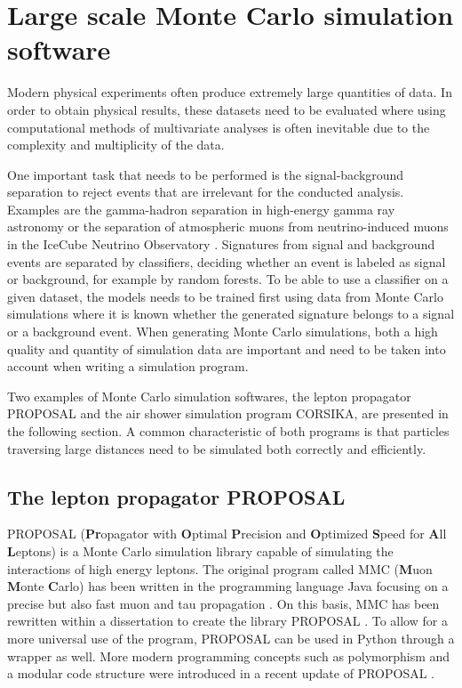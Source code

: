 \chapter{Large scale Monte Carlo simulation software}

\label{sec:theory}

Modern physical experiments often produce extremely large quantities of data.
In order to obtain physical results, these datasets need to be evaluated where using computational methods of multivariate analyses is often inevitable due to the complexity and multiplicity of the data.

One important task that needs to be performed is the signal-background separation to reject events that are irrelevant for the conducted analysis.
Examples are the gamma-hadron separation in high-energy gamma ray astronomy \cite{Ohm_2009} or the separation of atmospheric muons from neutrino-induced muons in the IceCube Neutrino Observatory \cite{Ahrens_2004}. 
Signatures from signal and background events are separated by classifiers, deciding whether an event is labeled as signal or background, for example by random forests.
To be able to use a classifier on a given dataset, the models needs to be trained first using data from Monte Carlo simulations where it is known whether the generated signature belongs to a signal or a background event.
When generating Monte Carlo simulations, both a high quality and quantity of simulation data are important and need to be taken into account when writing a simulation program.

Two examples of Monte Carlo simulation softwares, the lepton propagator PROPOSAL and the air shower simulation program CORSIKA, are presented in the following section.
A common characteristic of both programs is that particles traversing large distances need to be simulated both correctly and efficiently.

\section{The lepton propagator PROPOSAL}

PROPOSAL (\textbf{Pr}opagator with \textbf{O}ptimal \textbf{P}recision and \textbf{O}ptimized \textbf{S}peed for \textbf{A}ll \textbf{L}eptons) is a Monte Carlo simulation library capable of simulating the interactions of high energy leptons.
The original program called MMC (\textbf{M}uon \textbf{M}onte \textbf{C}arlo) has been written in the programming language Java focusing on a precise but also fast muon and tau propagation \cite{chirkin2004propagating}.
On this basis, MMC has been rewritten within a dissertation to create the \CC library PROPOSAL \cite{Kohne:2013zbq}.
To allow for a more universal use of the program, PROPOSAL can be used in Python through a wrapper as well.
More modern programming concepts such as polymorphism and a modular code structure were introduced in a recent update of PROPOSAL \cite{dunsch_2018_proposal_improvements}.

